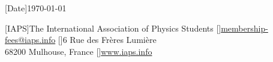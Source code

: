 
\usepackage[british]{babel}
\renewcommand*{\familydefault}{\ttdefault}
\usepackage{spreadtab}
\usepackage{tabularx}
\usepackage{fp}
\usepackage{eurosym}
\usepackage{hyperref}


[Date]{\today}

[IAPS]{The International Association of Physics Students}
[]{\href{mailto:membership-fees@iaps.info}{membership-fees@iaps.info}}
[]{6 Rue des Frères Lumière \\ 68200 Mulhouse, France}
[]{\href{https://www.iaps.info}{www.iaps.info}}

\newcommand{\frombank}{Caisse d'Epargne Grand Est Europe}
\newcommand{\frombankaddress}{34 Avenue du Général Leclerc}
\newcommand{\frombankaddressTwo}{68100 Mulhouse, France}
\newcommand{\frombankphone}{+33 389326141}
\newcommand{\fromiban}{DE00 0000 0000 0000 0000 00}
\newcommand{\frombic}{CEPAFRPP513}
\newcommand{\frompaypal}{\href{https://t1p.de/iaps-mfees}{t1p.de/iaps-mfees}}


